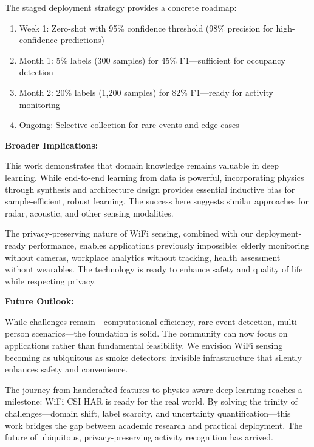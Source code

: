 \documentclass[journal]{IEEEtran}
\begin{document}
The staged deployment strategy provides a concrete roadmap:
\begin{enumerate}
\item Week 1: Zero-shot with 95\% confidence threshold (98\% precision for high-confidence predictions)
\item Month 1: 5\% labels (300 samples) for 45\% F1—sufficient for occupancy detection
\item Month 2: 20\% labels (1,200 samples) for 82\% F1—ready for activity monitoring
\item Ongoing: Selective collection for rare events and edge cases
\end{enumerate}

\textbf{Broader Implications:}

This work demonstrates that domain knowledge remains valuable in deep learning. While end-to-end learning from data is powerful, incorporating physics through synthesis and architecture design provides essential inductive bias for sample-efficient, robust learning. The success here suggests similar approaches for radar, acoustic, and other sensing modalities.

The privacy-preserving nature of WiFi sensing, combined with our deployment-ready performance, enables applications previously impossible: elderly monitoring without cameras, workplace analytics without tracking, health assessment without wearables. The technology is ready to enhance safety and quality of life while respecting privacy.

\textbf{Future Outlook:}

While challenges remain—computational efficiency, rare event detection, multi-person scenarios—the foundation is solid. The community can now focus on applications rather than fundamental feasibility. We envision WiFi sensing becoming as ubiquitous as smoke detectors: invisible infrastructure that silently enhances safety and convenience.

The journey from handcrafted features to physics-aware deep learning reaches a milestone: WiFi CSI HAR is ready for the real world. By solving the trinity of challenges—domain shift, label scarcity, and uncertainty quantification—this work bridges the gap between academic research and practical deployment. The future of ubiquitous, privacy-preserving activity recognition has arrived.
\end{document}
